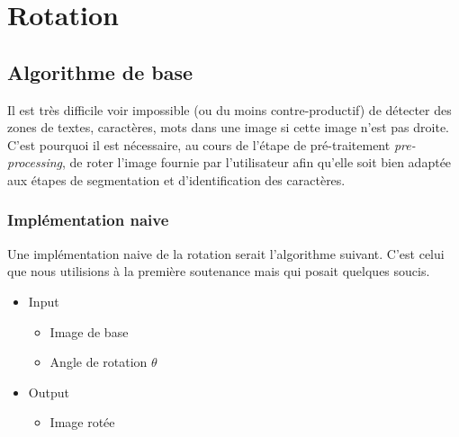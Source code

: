 \section{Rotation}

\subsection{Algorithme de base}

Il est très difficile voir impossible (ou du moins contre-productif) de
détecter des zones de textes, caractères, mots dans une image si cette image
n'est pas droite. C'est pourquoi il est nécessaire, au cours de l'étape de
pré-traitement \emph{pre-processing}, de roter l'image fournie par l'utilisateur
afin qu'elle soit bien adaptée aux étapes de segmentation et d'identification
des caractères. \\

\subsubsection{Implémentation naive}

Une implémentation naive de la rotation serait l'algorithme suivant. C'est
celui que nous utilisions à la première soutenance mais qui posait quelques
soucis. \\

\begin{itemize}
  \item{Input}
    \begin{itemize}
      \item Image de base
      \item Angle de rotation $\theta$
    \end{itemize}
  \item{Output}
    \begin{itemize}
      \item Image rotée
    \end{itemize}
\end{itemize}

